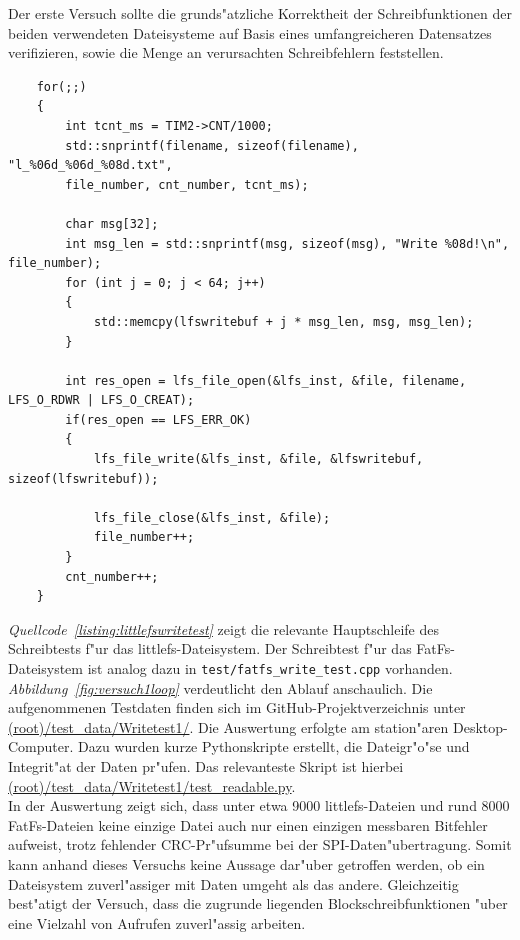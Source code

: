 \documentclass[11pt]{article}
\newcommand*{\fig}[1]{\textit{Abbildung~\ref{#1}}}
\newcommand*{\coderef}[1]{\textit{Quellcode~\ref{#1}}}
\begin{document}
Der erste Versuch sollte die grunds"atzliche Korrektheit der Schreibfunktionen
der beiden verwendeten Dateisysteme
auf Basis eines umfangreicheren Datensatzes verifizieren, sowie die Menge an verursachten
Schreibfehlern feststellen.

\begin{listing}[H]
    \begin{verbatim}
    for(;;)
    {
        int tcnt_ms = TIM2->CNT/1000;
        std::snprintf(filename, sizeof(filename), "l_%06d_%06d_%08d.txt", 
        file_number, cnt_number, tcnt_ms);

        char msg[32];
        int msg_len = std::snprintf(msg, sizeof(msg), "Write %08d!\n", file_number);
        for (int j = 0; j < 64; j++)
        {
            std::memcpy(lfswritebuf + j * msg_len, msg, msg_len);
        }

        int res_open = lfs_file_open(&lfs_inst, &file, filename, LFS_O_RDWR | LFS_O_CREAT);
        if(res_open == LFS_ERR_OK)
        {
            lfs_file_write(&lfs_inst, &file, &lfswritebuf, sizeof(lfswritebuf));

            lfs_file_close(&lfs_inst, &file);
            file_number++;
        }
        cnt_number++;
    }
    \end{verbatim}
\caption{Hauptschleife aus \texttt{test/littlefs\_write\_test.cpp}}
\label{listing:littlefswritetest}
\end{listing}

\coderef{listing:littlefswritetest} zeigt die relevante Hauptschleife des Schreibtests f"ur das littlefs-Dateisystem.
Der Schreibtest f"ur das FatFs-Dateisystem ist analog dazu in \texttt{test/fatfs\_write\_test.cpp} vorhanden.
\fig{fig:versuch1loop} verdeutlicht den Ablauf anschaulich. 
Die aufgenommenen Testdaten finden sich im GitHub-Projektverzeichnis unter 
\href{https://github.com/miko8278/stm32-SPI-SD-card/tree/main/test\_data/Writetest1}{(root)/test\_data/Writetest1/}.
Die Auswertung erfolgte am station"aren Desktop-Computer. Dazu wurden kurze Pythonskripte erstellt, die
Dateigr"o"se und Integrit"at der Daten pr"ufen. Das relevanteste Skript ist hierbei 
\href{https://github.com/miko8278/stm32-SPI-SD-card/blob/main/test\_data/Writetest1/test\_readable.py}{(root)/test\_data/Writetest1/test\_readable.py}.
\\In der Auswertung zeigt sich, dass unter etwa 9000 littlefs-Dateien und rund 8000 FatFs-Dateien keine einzige Datei auch nur
einen einzigen messbaren Bitfehler aufweist, trotz fehlender CRC-Pr"ufsumme bei der SPI-Daten"ubertragung.
Somit kann anhand dieses Versuchs keine Aussage dar"uber getroffen werden,
ob ein Dateisystem zuverl"assiger mit Daten umgeht als das andere.
Gleichzeitig best"atigt der Versuch, dass die zugrunde liegenden Blockschreibfunktionen "uber eine Vielzahl von Aufrufen zuverl"assig arbeiten.
\end{document}
